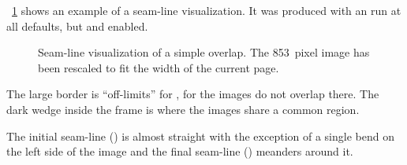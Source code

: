%
%
\figureName~\ref{fig:seam-line-visualization} shows an example of a seam-line visualization.  It
was produced with an \App{} run at all defaults, but  and
 enabled.

\begin{figure}
  \begin{maxipage}
    \centering
  \end{maxipage}

  \caption[Seam-line visualization]{\label{fig:seam-line-visualization}%
    Seam-line visualization of a simple overlap.  \ifhevea \relax\else The
    853~pixel image has been rescaled to fit the width of the current page.\fi}
\end{figure}

The large  border is ``off-limits'' for \App, for the
images do not overlap there.  The dark wedge inside the
 frame is where the images share a common region.

The initial seam-line () is almost straight with the
exception of a single bend on the left side of the image and the final seam-line
() meanders around it.


